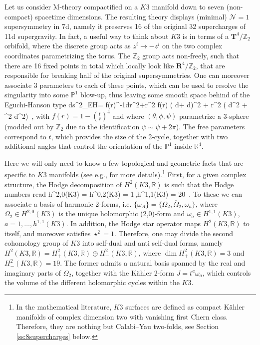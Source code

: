 Let us consider M-theory compactified on a $K3$ manifold down to seven (non-compact) spacetime dimensions. The resulting theory displays (minimal) $\mathcal{N}=1$ supersymmetry in 7d, namely it preserves 16 of the original 32 supercharges of 11d supergravity. In fact, a useful way to think about $K3$ is in terms of a $\mathbf{T}^4/\mathbb{Z}_2$ orbifold, where the discrete group acts as $z^i \to -z^i$ on the two complex coordinates parametrizing the torus. The $\mathbb{Z}_2$ group acts non-freely, such that there are 16 fixed points in total which locally look like $\mathbf{R}^4/\mathbb{Z}_2$, that are responsible for breaking half of the original supersymmetries. One can moreover associate 3 parameters to each of these points, which can be used to resolve the singularity into some $\mathbb{P}^1$ blow-up, thus leaving some smooth space behind of the Eguchi-Hanson type \cite{Eguchi:1978gw}
%
\beq\label{eq:EguchiHanson}
	ds^2_{\rm{EH}}= f(r)^{-1}dr^2+r^2 f(r) \left( d\psi + \cos \theta d\phi \right)^2 + r^2 \left( d\theta^2 + \sin^2 \theta d\phi^2\right)\, ,
\eeq
%
with $f(r)=1-\left(\frac{t}{r}\right)^4$ and where $(\theta, \phi, \psi)$ parametrize a 3-sphere (modded out by $\mathbb{Z}_2$ due to the identification $\psi \sim \psi + 2\pi$). The free parameters correspond to $t$, which provides the size of the 2-cycle, together with two additional angles that control the orientation of the $\mathbb{P}^1$ inside $\mathbb{R}^4$. 

Here we will only need to know a few topological and geometric facts that are specific to $K3$ manifolds (see e.g., \cite{Aspinwall:1996mn} for more details).\footnote{In the mathematical literature, $K3$ surfaces are defined as compact K\"ahler manifolds of complex dimension two with vanishing first Chern class. Therefore, they are nothing but Calabi--Yau two-folds, see Section \ref{ss:8supercharges} below.} First, for a given complex structure, the Hodge decomposition of $H^2(K3, \mathbb{R})$ is such that the Hodge numbers read
%
\beq\label{eq:hodgeK3}
	h^{2,0}(K3) = h^{0,2}(K3) = 1\,,\qquad h^{1,1}(K3) = 20\, .
\eeq
%
To these we can associate a basis of harmonic 2-forms, i.e. $\lbrace \omega_A \rbrace= \lbrace \Omega_2, \overline \Omega_2, \omega_a \rbrace$, where $\Omega_2 \in H^{2,0}(K3)$ is the unique holomorphic (2,0)-form and $\omega_a \in H^{1,1}(K3)$, $a=1, \ldots, h^{1,1}(K3)$. In addition, the Hodge star operator maps $H^2(K3, \mathbb{R})$ to itself, and moreover satisfies $\star^2=1$. Therefore, one may divide the second cohomology group of $K3$ into self-dual and anti self-dual  forms, namely $H^2(K3, \mathbb{R}) = H_+^2(K3, \mathbb{R}) \oplus H_-^2(K3, \mathbb{R})$, where $\dim H_+^2(K3, \mathbb{R})=3$ and $H_-^2(K3, \mathbb{R})=19$. The former admits a natural basis spanned by the real and imaginary parts of $\Omega_2$, together with the K\"ahler 2-form $J= t^a \omega_a$, which controls the volume of the different holomorphic cycles within the $K3$. 
		
